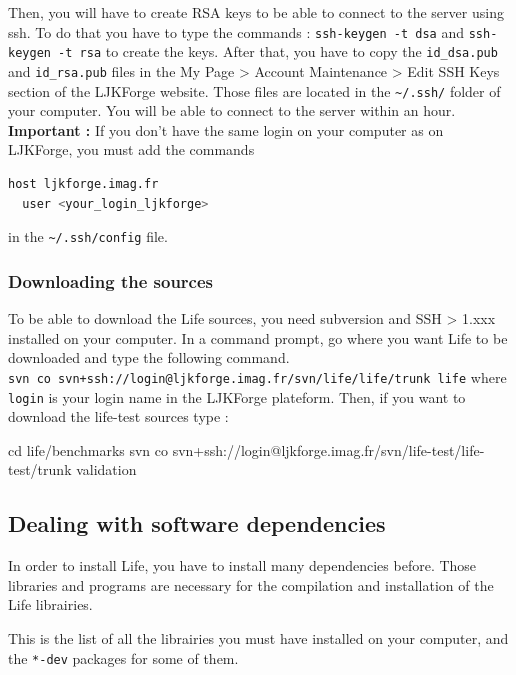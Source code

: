 \documentclass[a4paper]{book}
\newcommand{\life}{Life\xspace}
\begin{document}
Then, you will have to create RSA keys to be able to connect to the server
using ssh. To do that you have to type the commands :
\verb|ssh-keygen -t dsa| and \linebreak[2] \verb|ssh-keygen -t rsa| to create
the keys. After that, you have to copy the \verb|id_dsa.pub| and
\verb|id_rsa.pub| files in the My Page > Account Maintenance > Edit SSH Keys
section of the LJKForge website. Those files are located in the \verb|~/.ssh/|
folder of your computer. You will be able to connect to the server within an
hour.
\\
{\bfseries Important : } If you don't have the same login on your computer as on
LJKForge, you must add the commands
\begin{lstlisting}[language=sh]
host ljkforge.imag.fr
  user <your_login_ljkforge>
\end{lstlisting}
in the \verb|~/.ssh/config| file.

\subsubsection{Downloading the sources}
\label{sec:download-sources}

To be able to download the \life sources, you need subversion and SSH > 1.xxx
installed on your computer. In a command prompt, go where you want \life to be
downloaded and type the following command.
\\ \verb|svn co svn+ssh://login@ljkforge.imag.fr/svn/life/life/trunk life|
where \\ \verb|login| is your login name in the LJKForge plateform. Then, if
you want to download the life-test sources type :
\begin{unixcom}
  cd life/benchmarks
  svn co svn+ssh://login@ljkforge.imag.fr/svn/life-test/life-test/trunk validation
\end{unixcom}

\subsection{Dealing with software dependencies}
\label{sec:about-dependencies}

In order to install \life, you have to install many dependencies
before. Those libraries and programs are necessary for the
compilation and installation of the \life librairies.

This is the list of all the librairies you must have installed on your
computer, and the \verb|*-dev| packages for some of them.
\end{document}
